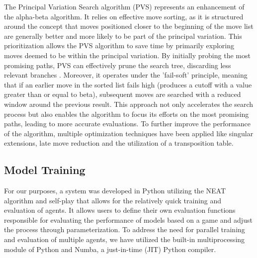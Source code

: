 \documentclass[letterpaper, 12pt]{article}
\makeatletter
\def\tikzscale{1}\begin{lrbox}{\measure@tikzpicture}%
\edef\tikzscale{\pgfmathresult}%
\makeatother
\begin{document}
The Principal Variation Search algorithm (PVS) \cite{Mar1982} represents an enhancement
of the alpha-beta algorithm. It relies on effective move sorting, as it is structured
around the concept that moves positioned closer to the beginning of the move list are
generally better and more likely to be part of the principal variation. This
prioritization allows the PVS algorithm to save time by primarily exploring moves deemed
to be within the principal variation. By initially probing the most promising paths, PVS
can effectively prune the search tree, discarding less relevant branches \cite{Mar1985}.
Moreover, it operates under the 'fail-soft' principle, meaning that if an earlier move
in the sorted list fails high (produces a cutoff with a value greater than or equal to
beta), subsequent moves are searched with a reduced window around the previous result.
This approach not only accelerates the search process but also enables the algorithm to
focus its efforts on the most promising paths, leading to more accurate evaluations. To
further improve the performance of the algorithm, multiple optimization techniques have
been applied like singular extensions, late move reduction and the utilization of a
transposition table.

\begin{scaletikzpicturetowidth}{\textwidth}
\end{scaletikzpicturetowidth}

\subsection{Model Training}
For our purposes, a system was developed in Python utilizing the NEAT algorithm and
self-play that allows for the relatively quick training and evaluation of agents. It
allows users to define their own evaluation functions responsible for evaluating the
performance of models based on a game and adjust the process through parameterization.
To address the need for parallel training and evaluation of multiple agents, we have
utilized the built-in multiprocessing module of Python and Numba, a just-in-time (JIT)
Python compiler.
\end{document}
